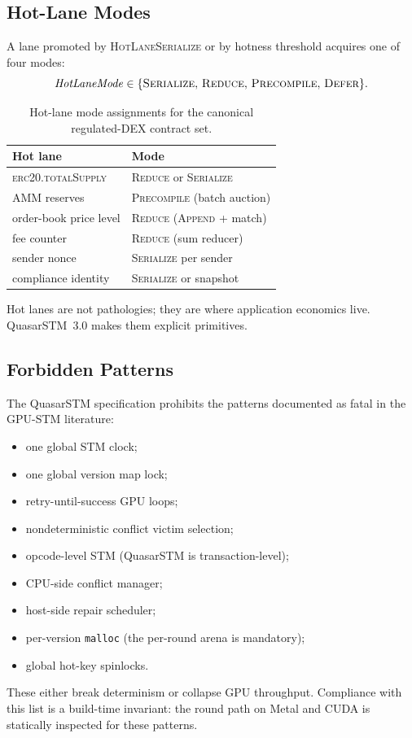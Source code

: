 \subsection{Hot-Lane Modes}

\begin{definition}
\label{def:hot-lane-mode}
A lane promoted by \textsc{HotLaneSerialize} or by hotness threshold
acquires one of four modes:
\[
\mathit{HotLaneMode} \in \{
\textsc{Serialize},\,
\textsc{Reduce},\,
\textsc{Precompile},\,
\textsc{Defer}\}.
\]
\end{definition}

\begin{table}[ht]
\centering
\begin{tabular}{@{}ll@{}}
\toprule
\textbf{Hot lane} & \textbf{Mode} \\
\midrule
\textsc{erc20.totalSupply} & \textsc{Reduce} or \textsc{Serialize} \\
AMM reserves               & \textsc{Precompile} (batch auction) \\
order-book price level     & \textsc{Reduce} (\textsc{Append} + match) \\
fee counter                & \textsc{Reduce} (sum reducer) \\
sender nonce               & \textsc{Serialize} per sender \\
compliance identity        & \textsc{Serialize} or snapshot \\
\bottomrule
\end{tabular}
\caption{Hot-lane mode assignments for the canonical regulated-DEX
contract set.}
\label{tab:hot-lane-modes}
\end{table}

Hot lanes are not pathologies; they are where application economics
live. QuasarSTM~3.0 makes them explicit primitives.

\subsection{Forbidden Patterns}

The QuasarSTM specification prohibits the patterns documented as
fatal in the GPU-STM literature:

\begin{itemize}[leftmargin=2em,nosep]
\item one global STM clock;
\item one global version map lock;
\item retry-until-success GPU loops;
\item nondeterministic conflict victim selection;
\item opcode-level STM (QuasarSTM is transaction-level);
\item CPU-side conflict manager;
\item host-side repair scheduler;
\item per-version \texttt{malloc} (the per-round arena is mandatory);
\item global hot-key spinlocks.
\end{itemize}

These either break determinism or collapse GPU throughput. Compliance
with this list is a build-time invariant: the round path on Metal and
CUDA is statically inspected for these patterns.


